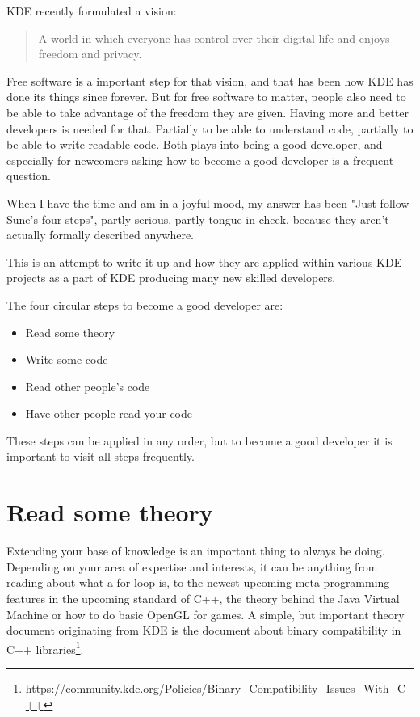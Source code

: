 

\noindent{}
KDE recently formulated a vision:
\begin{quote}
A world in which everyone has control over their digital life and enjoys freedom and privacy.
\end{quote}

Free software is a important step for that vision, and that has been how KDE has done its things since forever. But for free software to matter, people also need to be able to take advantage of the freedom they are given. Having more and better developers is needed for that. Partially to be able to understand code, partially to be able to write readable code. Both plays into being a good developer, and especially for newcomers asking how to become a good developer is a frequent question.

When I have the time and am in a joyful mood, my answer has been "Just follow Sune's four steps", partly serious, partly tongue in cheek, because they aren't actually formally described anywhere.

This is an attempt to write it up and how they are applied within various KDE projects as a part of KDE producing many new skilled developers.

The four circular steps to become a good developer are:
\begin{itemize}
 \item Read some theory
 \item Write some code
 \item Read other people's code
 \item Have other people read your code
\end{itemize}

These steps can be applied in any order, but to become a good developer it is important to visit all steps frequently.

\section*{Read some theory}
Extending your base of knowledge is an important thing to always be doing. Depending on your area of expertise and interests, it can be anything from reading about what a for-loop is, to the newest upcoming meta programming features in the upcoming standard of C++, the theory behind the Java Virtual Machine or how to do basic OpenGL for games. A simple, but important theory document originating from KDE is the document about binary compatibility in C++ libraries\footnote{\url{https://community.kde.org/Policies/Binary_Compatibility_Issues_With_C++}}.


